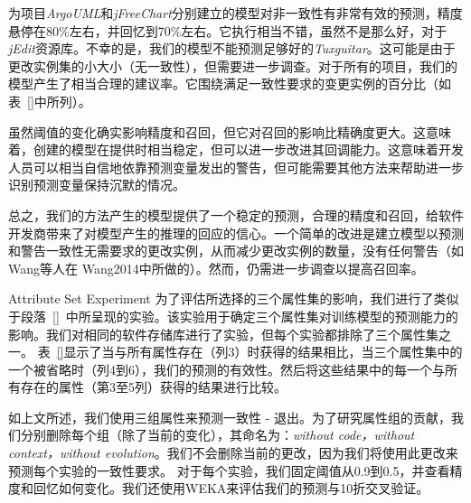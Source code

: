 {为项目{\em ArgoUML}和{\em jFreeChart}分别建立的模型对非一致性有非常有效的预测，精度悬停在80\%左右，并回忆到70\%左右。它执行相当不错，虽然不是那么好，对于{\em jEdit}资源库。不幸的是，我们的模型不能预测足够好的{\em Tuxguitar}。这可能是由于更改实例集的小大小（无一致性），但需要进一步调查。对于所有的项目，我们的模型产生了相当合理的建议率。它围绕满足一致性要求的变更实例的百分比（如表~\ref {}中所列）。

虽然阈值的变化确实影响精度和召回，但它对召回的影响比精确度更大。这意味着，创建的模型在提供时相当稳定，但可以进一步改进其回调能力。这意味着开发人员可以相当自信地依靠预测变量发出的警告，但可能需要其他方法来帮助进一步识别预测变量保持沉默的情况。

总之，我们的方法产生的模型提供了一个稳定的预测，合理的精度和召回，给软件开发商带来了对模型产生的推理的回应的信心。一个简单的改进是建立模型以预测和警告一致性无需要求的更改实例，从而减少更改实例的数量，没有任何警告（如Wang等人在\cite{} {Wang2014}中所做的）。然而，仍需进一步调查以提高召回率。

{Attribute Set Experiment}
为了评估所选择的三个属性集的影响，我们进行了类似于段落~\ref {}~中所呈现的实验。该实验用于确定三个属性集对训练模型的预测能力的影响。我们对相同的软件存储库进行了实验，但每个实验都排除了三个属性集之一。
表~\ref{}显示了当与所有属性存在（{列3}）时获得的结果相比，当三个属性集中的一个被省略时（{列4到6}），我们的预测的有效性。然后将这些结果中的每一个与所有存在的属性（第3至5列）获得的结果进行比较。

如上文所述，我们使用{三组属性}来预测一致性 - 退出。为了研究属性组的贡献，我们分别删除每个组（除了当前的变化），其命名为：{\em without code，without context，without evolution}。我们不会删除当前的更改，因为我们将使用此更改来预测每个实验的一致性要求。 对于每个实验，我们固定阈值从0.9到0.5，并查看精度和回忆如何变化。我们还使用WEKA来评估我们的预测与10折交叉验证。

}
